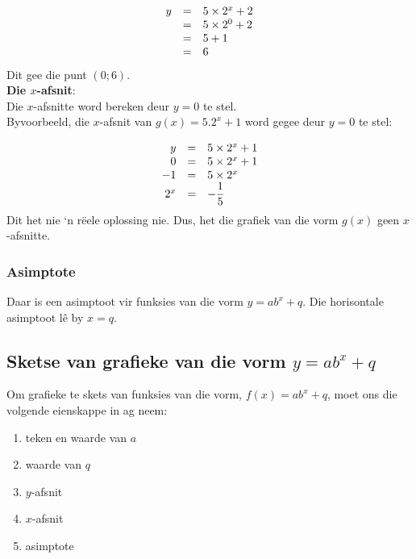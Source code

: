 \begin{equation*}
\begin{array}{ccl}\hfill y& =& 5 \times 2^{x}+2\hfill \\
 \hfill & =& 5 \times 2^{0}+2\hfill \\
 & =& 5+1\hfill \\ & =& 6\hfill 
\end{array}
\end{equation*}
Dit gee die punt $(0;6)$.\vspace{10pt}
\\
\textbf{Die $x$-afsnit}:\\
Die $x$-afsnitte word bereken deur $y=0$ te stel. \\
Byvoorbeeld, die $x$-afsnit van $g(x)=5.2^{x}+1$ word gegee deur $y=0$ te stel:\par 
\begin{equation*}
\begin{array}{ccl}\hfill y& =& 5 \times 2^{x}+1\hfill \\
 \hfill 0& =& 5 \times 2^{x}+1\hfill \\
 \hfill -1& =& 5 \times 2^{x}\hfill \\
 \hfill {2}^{x}& =& -\dfrac{1}{5}\hfill 
\end{array}
\end{equation*}
Dit het nie ‘n rëele oplossing nie. Dus, het die grafiek van die vorm $g(x)$ geen $x$-afsnitte.\par 

\subsubsection*{Asimptote}

Daar is een asimptoot vir funksies van die vorm $y=ab^{x}+q$. Die horisontale asimptoot lê by $x=q$. 


\subsection*{Sketse van grafieke van die vorm $y=ab^{x}+q$}

Om grafieke te skets van funksies van die vorm, $f(x)=ab^{x}+q$, moet ons die volgende eienskappe in ag neem:\par 
\begin{enumerate}[noitemsep, label=\textbf{\arabic*}. ] 
\item teken en waarde van $a$ 
\item waarde van $q$
\item $y$-afsnit
\item $x$-afsnit
\item asimptote
\end{enumerate}

